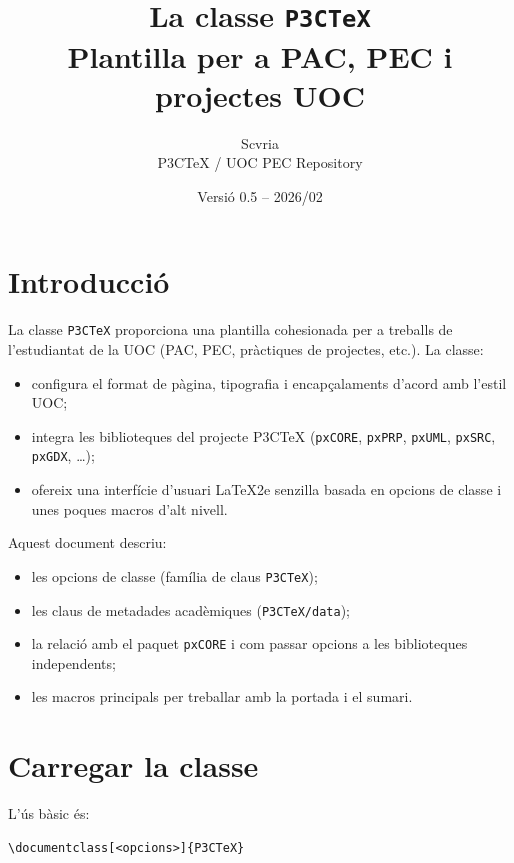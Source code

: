 \documentclass[default]{P3CTeX}
\begin{document}
\title{La classe \texttt{P3CTeX}\\
  \large Plantilla per a PAC, PEC i projectes UOC}
\author{Scvria\\P3CTeX / UOC PEC Repository}
\date{Versió 0.5 -- 2026/02}
\maketitle

\tableofcontents

\section{Introducció}

La classe \texttt{P3CTeX} proporciona una plantilla cohesionada per a
treballs de l'estudiantat de la UOC (PAC, PEC, pràctiques de projectes,
etc.). La classe:
\begin{itemize}
  \item configura el format de pàgina, tipografia i encapçalaments
        d'acord amb l'estil UOC;
  \item integra les biblioteques del projecte P3CTeX
        (\texttt{pxCORE}, \texttt{pxPRP}, \texttt{pxUML},
        \texttt{pxSRC}, \texttt{pxGDX}, \dots);
  \item ofereix una interfície d'usuari \LaTeX2e senzilla basada en
        opcions de classe i unes poques macros d'alt nivell.
\end{itemize}

Aquest document descriu:
\begin{itemize}
  \item les opcions de classe (família de claus \texttt{P3CTeX});
  \item les claus de metadades acadèmiques (\texttt{P3CTeX/data});
  \item la relació amb el paquet \texttt{pxCORE} i com passar opcions
        a les biblioteques independents;
  \item les macros principals per treballar amb la portada i el sumari.
\end{itemize}

\section{Carregar la classe}

L'ús bàsic és:
\begin{verbatim}
\documentclass[<opcions>]{P3CTeX}
\end{verbatim}
\end{document}
